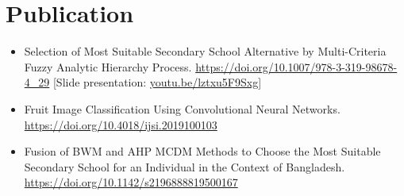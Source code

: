 \documentclass[a4-paper,10pt]{article}
\newcommand{\resumeItemWithoutHeading}[1]{
  \item\small{
    {#1 \vspace{-4pt}}
  }
}
\newcommand{\resumeSubHeadingListStart}{\begin{itemize}[leftmargin=*]}
\newcommand{\resumeSubHeadingListEnd}{\end{itemize}}
\begin{document}
\vspace{-3pt}

\section{Publication}
  \resumeSubHeadingListStart
    \resumeItemWithoutHeading
      {Selection of Most Suitable Secondary School Alternative by Multi-Criteria Fuzzy Analytic Hierarchy Process. \href{https://link.springer.com/chapter/10.1007\%2F978-3-319-98678-4_29}{https://doi.org/10.1007/978-3-319-98678-4\_29}} [Slide presentation: \href{https://youtu.be/lztxu5F9Sxg}{youtu.be/lztxu5F9Sxg}]

    \resumeItemWithoutHeading
      {Fruit Image Classification Using Convolutional Neural Networks. \href{https://www.igi-global.com/gateway/article/236206}{https://doi.org/10.4018/ijsi.2019100103}}
      
    \resumeItemWithoutHeading
      {Fusion of BWM and AHP MCDM Methods to Choose the Most Suitable Secondary School for an Individual in the Context of Bangladesh. \href{https://www.worldscientific.com/doi/abs/10.1142/S2196888819500167}{https://doi.org/10.1142/s2196888819500167}}
  \resumeSubHeadingListEnd
\end{document}
